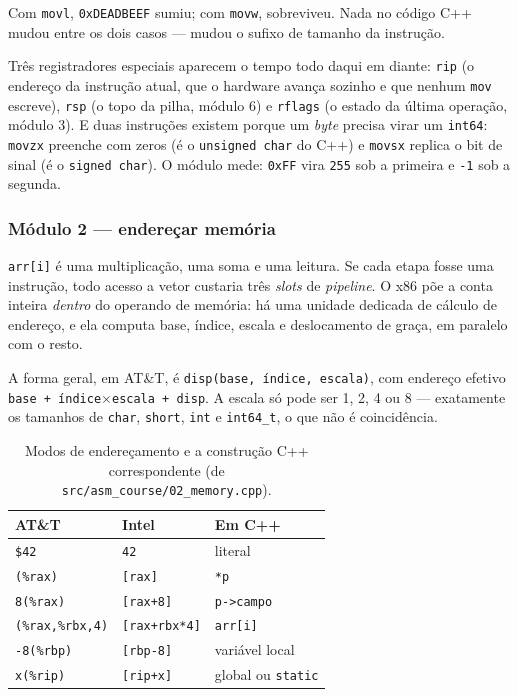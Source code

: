 Com \texttt{movl}, \texttt{0xDEADBEEF} sumiu; com \texttt{movw}, sobreviveu.
Nada no código C++ mudou entre os dois casos --- mudou o sufixo de tamanho da
instrução.

Três registradores especiais aparecem o tempo todo daqui em diante:
\texttt{rip} (o endereço da instrução atual, que o hardware avança sozinho e
que nenhum \texttt{mov} escreve), \texttt{rsp} (o topo da pilha, módulo 6) e
\texttt{rflags} (o estado da última operação, módulo 3). E duas instruções
existem porque um \emph{byte} precisa virar um \texttt{int64}: \texttt{movzx}
preenche com zeros (é o \texttt{unsigned char} do C++) e \texttt{movsx} replica
o bit de sinal (é o \texttt{signed char}). O módulo mede: \texttt{0xFF} vira
\texttt{255} sob a primeira e \texttt{-1} sob a segunda.

\subsubsection{Módulo 2 --- endereçar memória}

\begin{porque}
\texttt{arr[i]} é uma multiplicação, uma soma e uma leitura. Se cada etapa
fosse uma instrução, todo acesso a vetor custaria três \emph{slots} de
\emph{pipeline}. O x86 põe a conta inteira \emph{dentro} do operando de
memória: há uma unidade dedicada de cálculo de endereço, e ela computa base,
índice, escala e deslocamento de graça, em paralelo com o resto.
\end{porque}

A forma geral, em AT\&T, é \texttt{disp(base, índice, escala)}, com endereço
efetivo \texttt{base + índice$\times$escala + disp}. A escala só pode ser 1, 2,
4 ou 8 --- exatamente os tamanhos de \texttt{char}, \texttt{short},
\texttt{int} e \texttt{int64\_t}, o que não é coincidência.

\begin{table}[htbp]
\centering
\caption{Modos de endereçamento e a construção C++ correspondente
         (de \texttt{src/asm\_course/02\_memory.cpp}).}
\label{tab:enderecamento}
\footnotesize
\begin{tabular}{@{}lll@{}}
\toprule
\textbf{AT\&T} & \textbf{Intel} & \textbf{Em C++} \\
\midrule
\texttt{\$42}                & \texttt{42}              & literal \\
\texttt{(\%rax)}             & \texttt{[rax]}           & \texttt{*p} \\
\texttt{8(\%rax)}            & \texttt{[rax+8]}         & \texttt{p->campo} \\
\texttt{(\%rax,\%rbx,4)}     & \texttt{[rax+rbx*4]}     & \texttt{arr[i]} \\
\texttt{-8(\%rbp)}           & \texttt{[rbp-8]}         & variável local \\
\texttt{x(\%rip)}            & \texttt{[rip+x]}         & global ou \texttt{static} \\
\bottomrule
\end{tabular}
\end{table}

